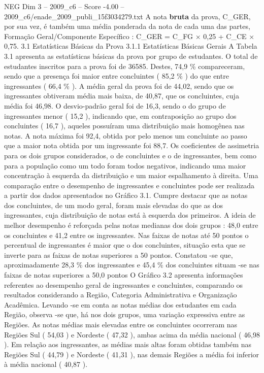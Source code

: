\begin{textsample}{NEG Dim 3 – 2009\_c6 – Score -4.00 – 2009\_c6/enade\_2009\_publi\_15f3034279.txt}
A nota \textbf{bruta} da prova, C\_GER, por sua vez, é também uma média ponderada da nota de cada uma das partes, Formação Geral/Componente Específico : C\_GER = C\_FG × 0,25 + C\_CE × 0,75. 3.1 Estatísticas Básicas da Prova 3.1.1 Estatísticas Básicas Gerais A Tabela 3.1 apresenta as estatísticas básicas da prova por grupo de estudantes.
O total de estudantes inscritos para a prova foi de 36585.
Destes, 74,9 \% compareceram, sendo que a presença foi maior entre concluintes ( 85,2 \% ) do que entre ingressantes ( 66,4 \% ).
A média geral da prova foi de 44,02, sendo que os ingressantes obtiveram média mais baixa, de 40,87, que os concluintes, cuja média foi 46,98.
O desvio-padrão geral foi de 16,3, sendo o do grupo de ingressantes menor ( 15,2 ), indicando que, em contraposição ao grupo dos concluintes ( 16,7 ), aqueles possuíram uma distribuição mais homogênea nas notas.
A nota máxima foi 92,4, obtida por pelo menos um concluinte ao passo que a maior nota obtida por um ingressante foi 88,7.
Os coeficientes de assimetria para os dois grupos considerados, o de concluintes e o de ingressantes, bem como para a população como um todo foram todos negativos, indicando uma maior concentração à esquerda da distribuição e um maior espalhamento à direita.
Uma comparação entre o desempenho de ingressantes e concluintes pode ser realizada a partir dos dados apresentados no Gráfico 3.1.
Cumpre destacar que as notas dos concluintes, de um modo geral, foram mais elevadas do que as dos ingressantes, cuja distribuição de notas está à esquerda dos primeiros.
A ideia de melhor desempenho é reforçada pelas notas medianas dos dois grupos : 48,0 entre os concluintes e 41,2 entre os ingressantes.
Nas faixas de notas até 50 pontos o percentual de ingressantes é maior que o dos concluintes, situação esta que se inverte para as faixas de notas superiores a 50 pontos.
Constatou -se que, aproximadamente 28,3 \% dos ingressantes e 45,4 \% dos concluintes situam -se nas faixas de notas superiores a 50,0 pontos O Gráfico 3.2 apresenta informações referentes ao desempenho geral de ingressantes e concluintes, comparando os resultados considerando a Região, Categoria Administrativa e Organização Acadêmica.
Levando -se em conta as notas médias dos estudantes em cada Região, observa -se que, há nos dois grupos, uma variação expressiva entre as Regiões.
As notas médias mais elevadas entre os concluintes ocorreram nas Regiões Sul ( 54,03 ) e Nordeste ( 47,32 ), ambas acima da média nacional ( 46,98 ).
Em relação aos ingressantes, as médias mais altas foram obtidas também nas Regiões Sul ( 44,79 ) e Nordeste ( 41,31 ), nas demais Regiões a média foi inferior à média nacional ( 40,87 ).

\end{textsample}
